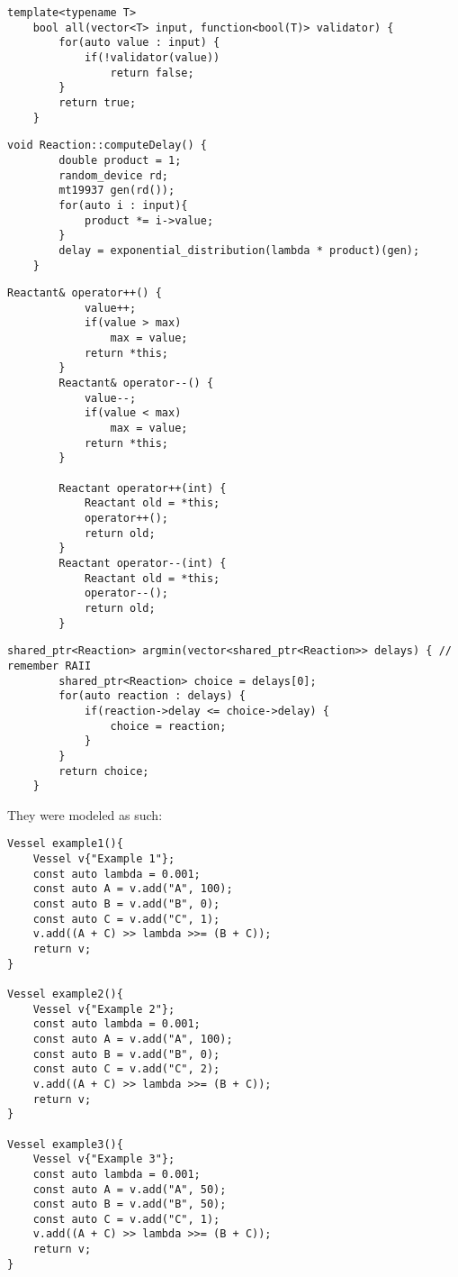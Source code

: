 \begin{lstlisting}[style=colorC++]
    template<typename T>
    bool all(vector<T> input, function<bool(T)> validator) {
        for(auto value : input) {
            if(!validator(value))
                return false;
        }
        return true;
    }
\end{lstlisting}

\begin{lstlisting}[style=colorC++]
    void Reaction::computeDelay() {
        double product = 1;
        random_device rd;
        mt19937 gen(rd());
        for(auto i : input){
            product *= i->value;
        }
        delay = exponential_distribution(lambda * product)(gen);
    }
\end{lstlisting}

\begin{lstlisting}[style=colorC++]
    Reactant& operator++() {
            value++;
            if(value > max)
                max = value;
            return *this;
        }
        Reactant& operator--() {
            value--;
            if(value < max)
                max = value;
            return *this;
        }

        Reactant operator++(int) {
            Reactant old = *this;
            operator++();
            return old;
        }
        Reactant operator--(int) {
            Reactant old = *this;
            operator--();
            return old;
        }
\end{lstlisting}

\begin{lstlisting}[style=colorC++]
    shared_ptr<Reaction> argmin(vector<shared_ptr<Reaction>> delays) { // remember RAII
        shared_ptr<Reaction> choice = delays[0];
        for(auto reaction : delays) {
            if(reaction->delay <= choice->delay) {
                choice = reaction;
            }
        }
        return choice;
    }
\end{lstlisting}


They were modeled as such:

\begin{lstlisting}[style=colorC++]
Vessel example1(){
    Vessel v{"Example 1"};
    const auto lambda = 0.001;
    const auto A = v.add("A", 100);
    const auto B = v.add("B", 0);
    const auto C = v.add("C", 1);
    v.add((A + C) >> lambda >>= (B + C));
    return v;
}

Vessel example2(){
    Vessel v{"Example 2"};
    const auto lambda = 0.001;
    const auto A = v.add("A", 100);
    const auto B = v.add("B", 0);
    const auto C = v.add("C", 2);
    v.add((A + C) >> lambda >>= (B + C));
    return v;
}

Vessel example3(){
    Vessel v{"Example 3"};
    const auto lambda = 0.001;
    const auto A = v.add("A", 50);
    const auto B = v.add("B", 50);
    const auto C = v.add("C", 1);
    v.add((A + C) >> lambda >>= (B + C));
    return v;
}
\end{lstlisting}

